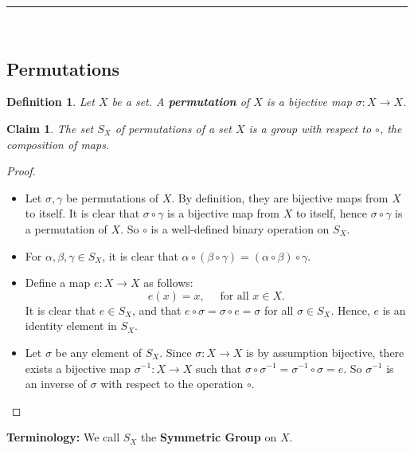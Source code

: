 \documentclass[a4paper,12pt]{report}
\newcommand{\ra}{\longrightarrow}
\newcounter{statement}
\numberwithin{statement}{chapter}
\newtheorem{defn}[statement]{Definition}
\newtheorem{claim}[statement]{Claim}
\numberwithin{equation}{chapter}
\numberwithin{section}{chapter}
\numberwithin{subsection}{section}
\begin{document}
\quad\\\hrule
\quad\\
\subsection*{Permutations}

\begin{defn}
Let $X$ be a set.  A  {\bf permutation}  of $X$ is a bijective map $\sigma : X \ra X$.
\end{defn}
\begin{claim}

The set $S_X$ of permutations of a set $X$
is a group with respect to $\circ$, the composition of maps.

\end{claim}
\begin{proof}

\begin{itemize}
\item 
Let $\sigma, \gamma$ be permutations of $X$.
By definition, they are bijective maps from $X$ to itself.
It is clear that $\sigma\circ\gamma$ is a bijective map from $X$ to itself,
hence $\sigma\circ\gamma$ is a permutation of $X$.  So $\circ$ is a well-defined
binary operation on $S_X$.

\item 
For $\alpha, \beta, \gamma \in S_X$, it is clear that
$\alpha\circ(\beta\circ \gamma) = (\alpha\circ\beta)\circ\gamma$.

\item 
Define a map $e : X \ra X$ as follows:
\[
e(x) = x,\quad \text{ for all } x \in X.
\]
It is clear that $e \in S_X$, and that $e \circ \sigma = \sigma\circ e = \sigma$
for all $\sigma \in S_X$.  Hence, $e$ is an identity element in $S_X$.

\item 
Let $\sigma$ be any element of $S_X$.  Since $\sigma : X \ra X$ is by assumption bijective,
there exists a bijective map $\sigma^{-1} : X \ra X$
such that $\sigma\circ\sigma^{-1} = \sigma^{-1}\circ \sigma = e$.
So $\sigma^{-1}$
is an inverse of $\sigma$ with respect to the operation $\circ$.
\end{itemize}


\end{proof}




 {\bf Terminology:} 
We call $S_X$ the  {\bf Symmetric Group}  on $X$.
\end{document}
